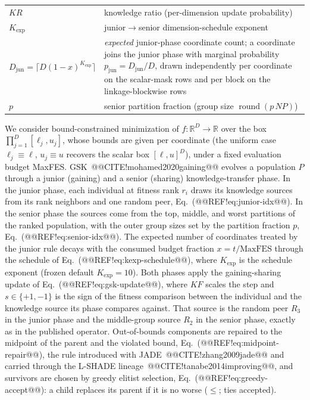 \documentclass[10pt,a4paper]{article}
\begin{document}
\begin{table}[t]
\begin{tabular}{@{}l@{\hspace{1.2em}}p{}@{}}
$KR$ & knowledge ratio (per-dimension update probability)\\
$K_{\exp}$ & junior$\to$senior dimension-schedule exponent\\
$D_{\text{jun}}=\lceil D(1-x)^{K_{\exp}}\rceil$ & \emph{expected} junior-phase coordinate count; a coordinate joins the junior phase with marginal probability $p_{\text{jun}}=D_{\text{jun}}/D$, drawn independently per coordinate on the scalar-mask rows and per block on the linkage-blockwise rows\\
$p$ & senior partition fraction (group size $\operatorname{round}(p\,NP)$)\\
\bottomrule
\end{tabular}
\end{table}




We consider bound-constrained minimization of
$f:\mathbb{R}^D\to\mathbb{R}$ over the box
$\prod_{j=1}^{D}[\ell_j,u_j]$, whose bounds are given per coordinate
(the uniform case $\ell_j\equiv\ell$, $u_j\equiv u$ recovers the scalar
box $[\ell,u]^D$), under a fixed
evaluation budget MaxFES.
GSK~@@CITE!mohamed2020gaining@@ evolves a population $P$ through a
junior (gaining) and a senior (sharing) knowledge-transfer phase.
In the junior phase, each individual at fitness rank $r_i$ draws its
knowledge sources from its rank neighbors and one random peer,
Eq.~(@@REF!eq:junior-idx@@). In the senior phase the sources come from
the top, middle, and worst partitions of the ranked population, with
the outer group sizes set by the partition fraction $p$,
Eq.~(@@REF!eq:senior-idx@@).
The expected number of coordinates treated by the junior rule decays with the
consumed budget fraction $x=t/\text{MaxFES}$ through the schedule of
Eq.~(@@REF!eq:kexp-schedule@@), where $K_{\exp}$ is the schedule exponent
(frozen default $K_{\exp}=10$). 
Both phases apply the gaining-sharing update of
Eq.~(@@REF!eq:gsk-update@@), where $KF$ scales the step and
$s\in\{+1,-1\}$ is the sign of the fitness comparison between the
individual and the knowledge source its phase compares against. That source is
the random peer $R_3$ in the junior phase and the middle-group source $R_2$
in the senior phase, exactly as in the published operator.
Out-of-bounds components are repaired to the midpoint of the parent and
the violated bound, Eq.~(@@REF!eq:midpoint-repair@@), the rule introduced
with JADE~@@CITE!zhang2009jade@@ and carried through the L-SHADE
lineage~@@CITE!tanabe2014improving@@, and survivors are chosen by
greedy elitist selection, Eq.~(@@REF!eq:greedy-accept@@): a
child replaces its parent if it is no worse ($\le$; ties accepted).
\end{document}
